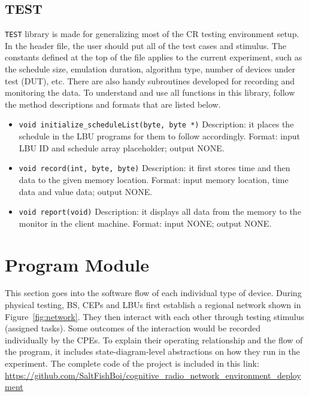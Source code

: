 \subsection{TEST}
\texttt{TEST} library is made for generalizing most of the CR testing environment setup. In the header file, the user should put all of the test cases and stimulus. The constants defined at the top of the file applies to the current experiment, such as the schedule size, emulation duration, algorithm type, number of devices under test (DUT), etc. There are also handy subroutines developed for recording and monitoring the data. To understand and use all functions in this library, follow the method descriptions and formats that are listed below.

\begin{itemize}
  \item \texttt{void initialize\_scheduleList(byte, byte *)}\newline
  Description: it places the schedule in the LBU programs for them to follow accordingly.\newline
  Format: input LBU ID and schedule array placeholder; output NONE.
  \item \texttt{void record(int, byte, byte)}\newline
  Description: it first stores time and then data to the given memory location.
  Format: input memory location, time data and value data; output NONE.
  \item \texttt{void report(void)}\newline
  Description: it displays all data from the memory to the monitor in the client machine.\newline
  Format: input NONE; output NONE.
\end{itemize}

\section{Program Module}

This section goes into the software flow of each individual type of device. During physical testing, BS, CEPs and LBUs first establish a regional network shown in Figure~\ref{fig:network}. They then interact with each other through testing stimulus (assigned tasks). Some outcomes of the interaction would be recorded individually by the CPEs. To explain their operating relationship and the flow of the program, it includes state-diagram-level abstractions on how they run in the experiment. The complete code of the project is included in this link: \url{https://github.com/SaltFishBoi/cognitive_radio_network_environment_deployment} 

